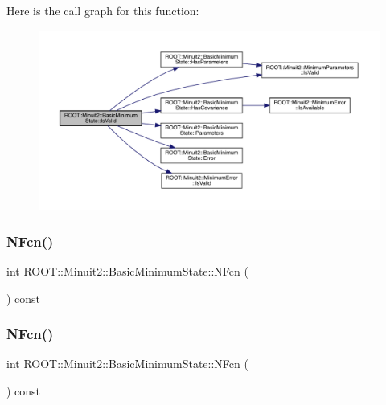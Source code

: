 Here is the call graph for this function\+:
\nopagebreak
\begin{figure}[H]
\begin{center}
\leavevmode
\includegraphics[width=350pt]{d0/db1/classROOT_1_1Minuit2_1_1BasicMinimumState_af92e32efe08fa047bc433db6f058d11a_cgraph}
\end{center}
\end{figure}
\mbox{\label{classROOT_1_1Minuit2_1_1BasicMinimumState_ac4566e929ac5ec9fe2dba914bb21207b}} 
\subsubsection{\texorpdfstring{NFcn()}{NFcn()}\hspace{0.1cm}{\footnotesize\ttfamily [1/2]}}
{\footnotesize\ttfamily int R\+O\+O\+T\+::\+Minuit2\+::\+Basic\+Minimum\+State\+::\+N\+Fcn (\begin{DoxyParamCaption}{ }\end{DoxyParamCaption}) const\hspace{0.3cm}{\ttfamily [inline]}}

\mbox{\label{classROOT_1_1Minuit2_1_1BasicMinimumState_ac4566e929ac5ec9fe2dba914bb21207b}} 
\subsubsection{\texorpdfstring{NFcn()}{NFcn()}\hspace{0.1cm}{\footnotesize\ttfamily [2/2]}}
{\footnotesize\ttfamily int R\+O\+O\+T\+::\+Minuit2\+::\+Basic\+Minimum\+State\+::\+N\+Fcn (\begin{DoxyParamCaption}{ }\end{DoxyParamCaption}) const\hspace{0.3cm}{\ttfamily [inline]}}


